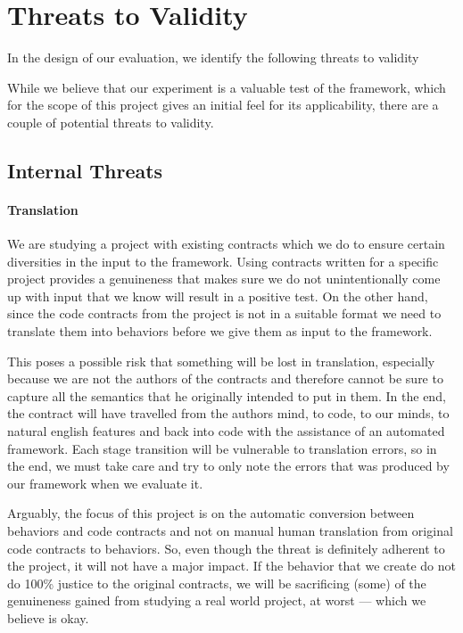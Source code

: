 \section{Threats to Validity}
In the design of our evaluation, we identify the following threats to validity

While we believe that our experiment  is a valuable test of the framework, which for the scope of this project gives an initial feel for its applicability, there are a couple of potential threats to validity.

\subsection{Internal Threats}
\paragraph{Translation}
We are studying a project with existing contracts which we do to ensure certain diversities in the input to the framework. Using contracts written for a specific project provides a genuineness that makes sure we do not unintentionally come up with input that we know will result in a positive test. On the other hand, since the code contracts from the project is not in a suitable format we need to translate them into behaviors before we give them as input to the framework.
 
This poses a possible risk that something will be lost in translation, especially because we are not the authors of the contracts and therefore cannot be sure to capture all the semantics that he originally intended to put in them. In the end, the contract will have travelled from the authors mind, to code, to our minds, to natural english features and back into code with the assistance of an automated framework. Each stage transition will be vulnerable to translation errors, so in the end, we must take care and try to only note the errors that was produced by our framework when we evaluate it.
 
Arguably, the focus of this project is on the automatic conversion between behaviors and code contracts and not on manual human translation from original code contracts to behaviors. So, even though the threat is definitely adherent to the project, it will not have a major impact. If the behavior that we create do not do 100\%  justice to the original contracts, we will be sacrificing (some) of the genuineness gained from studying a real world project, at worst --- which we believe is okay.

